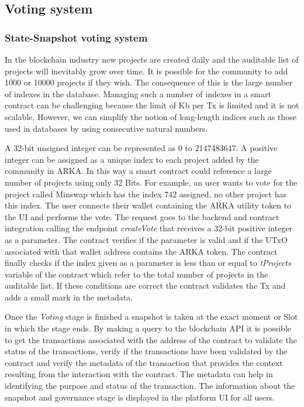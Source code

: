 \documentclass[12pt]{article}
\begin{document}
\subsection { Voting system } 


\subsubsection { State-Snapshot voting system } 


In the blockchain industry new projects are created daily and the auditable list of projects will inevitably grow over time. It is possible for the community to add 1000 or 10000 projects if they wish. The consequence of this is the large number of indexes in the database. Managing such a number of indexes in a smart contract can be challenging because the limit of Kb per Tx is limited and it is not scalable. However, we can simplify the notion of long-length indices such as those used in databases by using consecutive natural numbers.

A 32-bit unsigned integer can be represented as 0 to 2147483647. A positive integer can be assigned as a unique index to each project added by the community in ARKA. In this way a smart contract could reference a large number of projects using only 32 Bits. For example, an user wants to vote for the project called Minswap which has the index 742 assigned, no other project has this index. The user connects their wallet containing the ARKA utility token to the UI and performs the vote. The request goes to the backend and contract integration calling the endpoint \emph{createVote} that receives a 32-bit positive integer as a parameter. The contract verifies if the parameter is valid and if the UTxO associated with that wallet address contains the ARKA token. The contract finally checks if the index given as a parameter is less than or equal to \emph{tProjects} variable of the contract which refer to the total number of projects in the auditable list. If these conditions are correct the contract validates the Tx and adds a small mark in the metadata.


Once the \emph{Voting} stage is finished a snapshot is taken at the exact moment or Slot in which the stage ends. By making a query to the blockchain API it is possible to get the transactions associated with the address of the contract to validate the status of the transactions, verify if the transactions have been validated by the contract and verify the metadata of the transaction that provides the context resulting from the interaction with the contract. The metadata can help in identifying the purpose and status of the transaction. The information about the snapshot and governance stage is displayed in the platform UI for all users.
\end{document}
